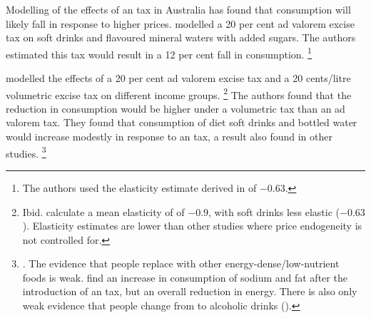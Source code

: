 \documentclass[embargoed]{grattan}
\begin{document}
Modelling of the effects of an \SSB{} tax in Australia has found that \SSB{} consumption will likely fall in response to higher prices. \textcite{Veerman2016ImpactTaxSugar} modelled a 20 per cent ad valorem excise tax on soft drinks and flavoured mineral waters with added sugars.
The authors estimated this tax would result in a 12 per cent fall in consumption.%
\footnote{The authors used the elasticity estimate derived in \textcite{Sharma2014effectstaxingsugarsweetened} of \(-0.63\).}

\textcite{Sharma2014effectstaxingsugarsweetened} modelled the effects of a 20 per cent ad valorem excise tax and a 20 cents/litre volumetric excise tax on different income groups.%
\footnote{Ibid. calculate a mean elasticity of \SSBs{} of \(-0.9\), with soft drinks less elastic (\(-0.63\)).
Elasticity estimates are lower than other studies where price endogeneity is not controlled for.} The authors found that the reduction in consumption would be higher under a volumetric tax than an ad valorem tax.
They found that consumption of diet soft drinks and bottled water would increase modestly in response to an \SSB{} tax, a result also found in other studies.%
\footnote{\textcites{Colchero2016Beveragepurchasesstores}{Briggs2013Overallincomespecific}{Falbe2015Higherretailprices}.
The evidence that people replace \SSBs{} with other energy-dense/low-nutrient foods is weak. \textcite{Zhen2014Predictingeffectssugar} find an increase in consumption of sodium and fat after the introduction of an \SSB{} tax, but an overall reduction in energy.
There is also only weak evidence that people change from \SSBs{} to alcoholic drinks (\textcite{Wansink2014cokecoorsfield}).}
\end{document}

